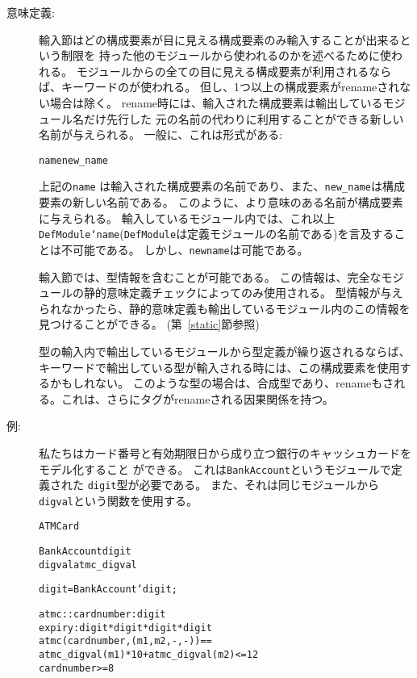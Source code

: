 \documentclass[\pformat,12pt]{jarticle}
\begin{document}
\begin{description}
\item[意味定義:] 輸入節はどの構成要素が目に見える構成要素のみ輸入することが出来るという制限を
  持った他のモジュールから使われるのかを述べるために使われる。
  モジュールからの全ての目に見える構成要素が利用されるならば、キーワードのが使われる。
  但し、1つ以上の構成要素がrenameされない場合は除く。
  rename時には、輸入された構成要素は輸出しているモジュール名だけ先行した
  元の名前の代わりに利用することができる新しい名前が与えられる。
  一般に、これは形式がある:
  \begin{alltt}
    name  new_name
  \end{alltt}
  上記の{\tt name} は輸入された構成要素の名前であり、また、{\tt new\_name}は構成要素の新しい名前である。
  このように、より意味のある名前が構成要素に与えられる。
  輸入しているモジュール内では、これ以上{\tt DefModule`name}({\tt DefModule}は定義モジュールの名前である)を言及することは不可能である。
  しかし、{\tt newname}は可能である。

  輸入節では、型情報を含むことが可能である。
  この情報は、完全なモジュールの静的意味定義チェックによってのみ使用される。
  型情報が与えられなかったら、静的意味定義も輸出しているモジュール内のこの情報を見つけることができる。
  (第~\ref{static}節参照)
  
  型の輸入内で輸出しているモジュールから型定義が繰り返されるならば、
  キーワードで輸出している型が輸入される時には、この構成要素を使用するかもしれない。
  このような型の場合は、合成型であり、renameもされる。これは、さらにタグがrenameされる因果関係を持つ。
  
\item[例:] 私たちはカード番号と有効期限日から成り立つ銀行のキャッシュカードをモデル化すること
ができる。 これは\texttt{BankAccount}というモジュールで定義された \texttt{digit}型が必要である。
また、それは同じモジュールから\texttt{digval}という関数を使用する。
\begin{alltt}
 ATMCard

     BankAccount  digit 
                      digval  atmc_digval




    digit = BankAccount`digit;

    atmc:: cardnumber :  digit
           expiry : digit * digit * digit * digit
    atmc(cardnumber, (m1,m2,-,-)) ==
        atmc_digval(m1) * 10 + atmc_digval(m2) <= 12 
         cardnumber >= 8


\end{alltt}
\end{description}
\end{document}
